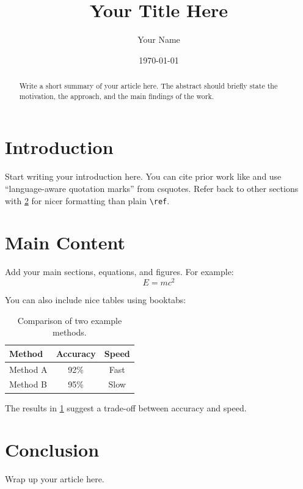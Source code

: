 \documentclass[11pt,a4paper]{article}
\title{Your Title Here}
\author{Your Name}
\date{\today}
\begin{document}
\maketitle

\begin{abstract}
Write a short summary of your article here. The abstract should briefly state
the motivation, the approach, and the main findings of the work.
\end{abstract}

\section{Introduction}
\label{sec:intro}

Start writing your introduction here. You can cite prior work like
\cite{knuth1984} and use \enquote{language-aware quotation marks} from csquotes.
Refer back to other sections with \cref{sec:main} for nicer formatting than
plain \texttt{\textbackslash ref}.

\section{Main Content}
\label{sec:main}

Add your main sections, equations, and figures. For example:
\[
    E = mc^2
\]

You can also include nice tables using booktabs:

\begin{table}[h]
  \centering
  \begin{tabular}{lcc}
    \toprule
    Method & Accuracy & Speed \\
    \midrule
    Method A & 92\% & Fast \\
    Method B & 95\% & Slow \\
    \bottomrule
  \end{tabular}
  \caption{Comparison of two example methods.}
  \label{tab:methods}
\end{table}

The results in \cref{tab:methods} suggest a trade-off between accuracy and speed.

\section{Conclusion}

Wrap up your article here.

\printbibliography
\end{document}
